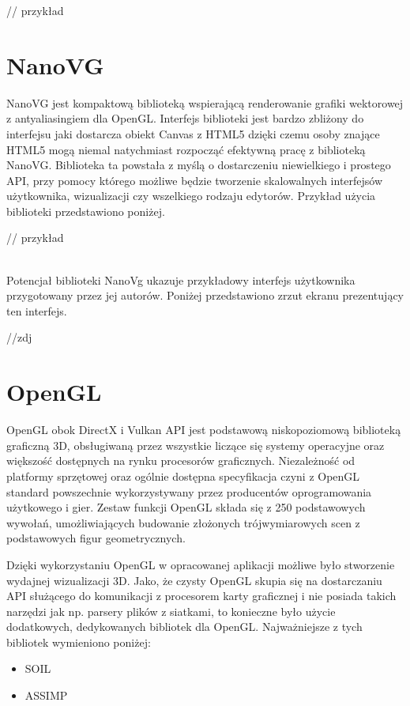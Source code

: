 \documentclass[a4paper,11pt,twoside]{report}
\theoremstyle{definition}
\begin{document}
// przykład 

\section{NanoVG}

NanoVG jest kompaktową biblioteką wspierającą renderowanie grafiki wektorowej z antyaliasingiem dla OpenGL. Interfejs biblioteki jest bardzo zbliżony do interfejsu jaki dostarcza obiekt Canvas z HTML5 dzięki czemu osoby znające HTML5 mogą niemal natychmiast rozpocząć efektywną pracę z biblioteką NanoVG. Biblioteka ta powstała z myślą o dostarczeniu niewielkiego i prostego API, przy pomocy którego możliwe będzie tworzenie skalowalnych interfejsów użytkownika, wizualizacji czy wszelkiego rodzaju edytorów. Przykład użycia biblioteki przedstawiono poniżej.

// przykład

~\\Potencjał biblioteki NanoVg ukazuje przykładowy interfejs użytkownika przygotowany przez jej autorów. Poniżej przedstawiono zrzut ekranu prezentujący ten interfejs.

//zdj

\section{OpenGL}

OpenGL obok DirectX i Vulkan API jest podstawową niskopoziomową biblioteką graficzną 3D, obsługiwaną przez wszystkie liczące się systemy operacyjne oraz większość dostępnych na rynku procesorów graficznych. Niezależność od platformy sprzętowej oraz ogólnie dostępna specyfikacja czyni z OpenGL standard powszechnie wykorzystywany przez producentów oprogramowania użytkowego i gier. Zestaw funkcji OpenGL składa się z 250 podstawowych wywołań, umożliwiających budowanie złożonych trójwymiarowych scen z podstawowych figur geometrycznych.

Dzięki wykorzystaniu OpenGL w opracowanej aplikacji możliwe było stworzenie wydajnej wizualizacji 3D. Jako, że czysty OpenGL skupia się na dostarczaniu API służącego do komunikacji z procesorem karty graficznej i nie posiada takich narzędzi jak np. parsery plików z siatkami, to konieczne było użycie dodatkowych, dedykowanych bibliotek dla OpenGL. Najważniejsze z tych bibliotek wymieniono poniżej:
\begin{itemize}
	\item SOIL
	\item ASSIMP
\end{itemize}
\end{document}
